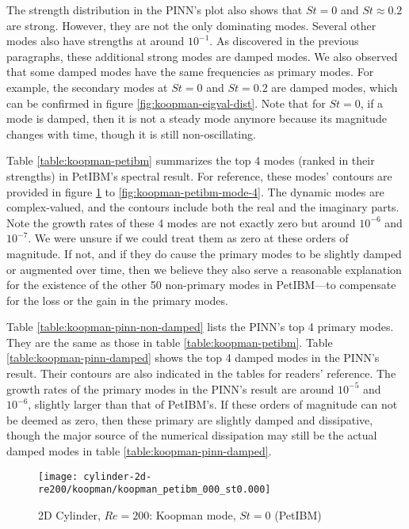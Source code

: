 The strength distribution in the PINN's plot also shows that $St=0$ and $St\approx 0.2$ are strong.
However, they are not the only dominating modes.  
Several other modes also have strengths at around $10^{-1}$.
As discovered in the previous paragraphs, these additional strong modes are damped modes.
We also observed that some damped modes have the same frequencies as primary modes.
For example, the secondary modes at $St=0$ and $St=0.2$ are damped modes, which can be confirmed in figure \ref{fig:koopman-eigval-dist}.
Note that for $St=0$, if a mode is damped, then it is not a steady mode anymore because its magnitude changes with time, though it is still non-oscillating.



Table \ref{table:koopman-petibm} summarizes the top 4 modes (ranked in their strengths) in PetIBM's spectral result.
For reference, these modes' contours are provided in figure \ref{fig:koopman-petibm-mode-1} to \ref{fig:koopman-petibm-mode-4}.
The dynamic modes are complex-valued, and the contours include both the real and the imaginary parts.
Note the growth rates of these 4 modes are not exactly zero but around $10^{-6}$ and $10^{-7}$.
We were unsure if we could treat them as zero at these orders of magnitude.
If not, and if they do cause the primary modes to be slightly damped or augmented over time, then we believe they also serve a reasonable explanation for the existence of the other 50 non-primary modes in PetIBM---to compensate for the loss or the gain in the primary modes.

Table \ref{table:koopman-pinn-non-damped} lists the PINN's top 4 primary modes. They are the same as those in table \ref{table:koopman-petibm}.
Table \ref{table:koopman-pinn-damped} shows the top 4 damped modes in the PINN's result.
Their contours are also indicated in the tables for readers' reference.
The growth rates of the primary modes in the PINN's result are around $10^{-5}$ and $10^{-6}$, slightly larger than that of PetIBM's.
If these orders of magnitude can not be deemed as zero, then these primary are slightly damped and dissipative, though the major source of the numerical dissipation may still be the actual damped modes in table \ref{table:koopman-pinn-damped}.



\begin{figure}[hbt!]
    \centering
    \texttt{[image: cylinder-2d-re200/koopman/koopman\_petibm\_000\_st0.000]}
    \caption{2D Cylinder, $Re=200$: Koopman mode, $St=0$ (PetIBM)}
    \label{fig:koopman-petibm-mode-1}
\end{figure}

